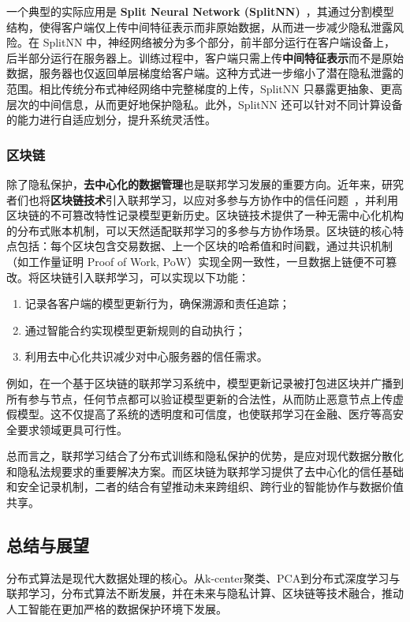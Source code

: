 \documentclass[lang=cn,newtx,10pt,scheme=chinese,chinesefont=nofont,citestyle=gb7714-2015, bibstyle=gb7714-2015]{elegantbook}
\begin{document}
\begin{refsection}
一个典型的实际应用是 \textbf{Split Neural Network (SplitNN)}~\cite{gupta2018}，其通过分割模型结构，使得客户端仅上传中间特征表示而非原始数据，从而进一步减少隐私泄露风险。在 SplitNN 中，神经网络被分为多个部分，前半部分运行在客户端设备上，后半部分运行在服务器上。训练过程中，客户端只需上传\textbf{中间特征表示}而不是原始数据，服务器也仅返回单层梯度给客户端。这种方式进一步缩小了潜在隐私泄露的范围。相比传统分布式神经网络中完整梯度的上传，SplitNN 只暴露更抽象、更高层次的中间信息，从而更好地保护隐私。此外，SplitNN 还可以针对不同计算设备的能力进行自适应划分，提升系统灵活性。

\subsubsection{区块链}

除了隐私保护，\textbf{去中心化的数据管理}也是联邦学习发展的重要方向。近年来，研究者们也将\textbf{区块链技术}引入联邦学习，以应对多参与方协作中的信任问题~\cite{xu2019federated}，并利用区块链的不可篡改特性记录模型更新历史。区块链技术提供了一种无需中心化机构的分布式账本机制，可以天然适配联邦学习的多参与方协作场景。区块链的核心特点包括：每个区块包含交易数据、上一个区块的哈希值和时间戳，通过共识机制（如工作量证明 Proof of Work, PoW）实现全网一致性，一旦数据上链便不可篡改。将区块链引入联邦学习，可以实现以下功能：
\begin{enumerate}
    \item 记录各客户端的模型更新行为，确保溯源和责任追踪；
    \item 通过智能合约实现模型更新规则的自动执行；
    \item 利用去中心化共识减少对中心服务器的信任需求。
\end{enumerate}

例如，在一个基于区块链的联邦学习系统中，模型更新记录被打包进区块并广播到所有参与节点，任何节点都可以验证模型更新的合法性，从而防止恶意节点上传虚假模型。这不仅提高了系统的透明度和可信度，也使联邦学习在金融、医疗等高安全要求领域更具可行性。

总而言之，联邦学习结合了分布式训练和隐私保护的优势，是应对现代数据分散化和隐私法规要求的重要解决方案。而区块链为联邦学习提供了去中心化的信任基础和安全记录机制，二者的结合有望推动未来跨组织、跨行业的智能协作与数据价值共享。


\subsection{总结与展望}
分布式算法是现代大数据处理的核心。从k-center聚类、PCA到分布式深度学习与联邦学习，分布式算法不断发展，并在未来与隐私计算、区块链等技术融合，推动人工智能在更加严格的数据保护环境下发展。




\end{refsection}
\end{document}
